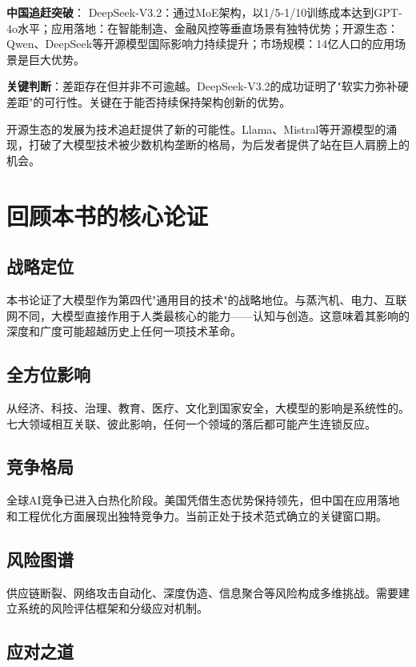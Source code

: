 \textbf{中国追赶突破}：
DeepSeek-V3.2：通过MoE架构，以1/5-1/10训练成本达到GPT-4o水平；应用落地：在智能制造、金融风控等垂直场景有独特优势；开源生态：Qwen、DeepSeek等开源模型国际影响力持续提升；市场规模：14亿人口的应用场景是巨大优势。

\textbf{关键判断}：差距存在但并非不可逾越。DeepSeek-V3.2的成功证明了"软实力弥补硬差距"的可行性。关键在于能否持续保持架构创新的优势。

开源生态的发展为技术追赶提供了新的可能性。Llama、Mistral等开源模型的涌现，打破了大模型技术被少数机构垄断的格局，为后发者提供了站在巨人肩膀上的机会。

\section{回顾本书的核心论证}

\subsection{战略定位}

本书论证了大模型作为第四代"通用目的技术"的战略地位。与蒸汽机、电力、互联网不同，大模型直接作用于人类最核心的能力——认知与创造。这意味着其影响的深度和广度可能超越历史上任何一项技术革命。

\subsection{全方位影响}

从经济、科技、治理、教育、医疗、文化到国家安全，大模型的影响是系统性的。七大领域相互关联、彼此影响，任何一个领域的落后都可能产生连锁反应。

\subsection{竞争格局}

全球AI竞争已进入白热化阶段。美国凭借生态优势保持领先，但中国在应用落地和工程优化方面展现出独特竞争力。当前正处于技术范式确立的关键窗口期。

\subsection{风险图谱}

供应链断裂、网络攻击自动化、深度伪造、信息聚合等风险构成多维挑战。需要建立系统的风险评估框架和分级应对机制。

\subsection{应对之道}

